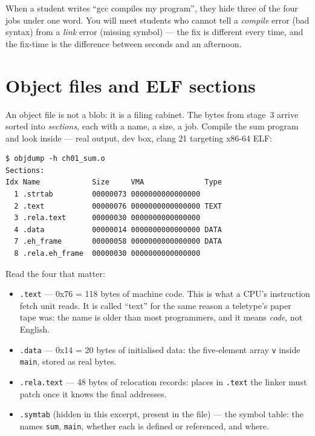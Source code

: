 \begin{tripwire}
When a student writes ``gcc compiles my program'', they hide three of the
four jobs under one word. You will meet students who cannot tell a
\emph{compile} error (bad syntax) from a \emph{link} error (missing
symbol) --- the fix is different every time, and the fix-time is the
difference between seconds and an afternoon.
\end{tripwire}

\section{Object files and ELF sections}
\label{sec:elf01}

An object file is not a blob: it is a filing cabinet. The bytes from
stage~3 arrive sorted into \emph{sections}, each with a name, a size, a
job. Compile the sum program and look inside --- real output, dev box,
clang 21 targeting x86-64 ELF:

\begin{lstlisting}[basicstyle=\ttfamily\scriptsize]
$ objdump -h ch01_sum.o
Sections:
Idx Name            Size     VMA              Type
  1 .strtab         00000073 0000000000000000
  2 .text           00000076 0000000000000000 TEXT
  3 .rela.text      00000030 0000000000000000
  4 .data           00000014 0000000000000000 DATA
  7 .eh_frame       00000058 0000000000000000 DATA
  8 .rela.eh_frame  00000030 0000000000000000
\end{lstlisting}

Read the four that matter:

\begin{itemize}
  \item \texttt{.text} --- 0x76 = 118 bytes of machine code. This is what
        a CPU's instruction fetch unit reads. It is called ``text'' for
        the same reason a teletype's paper tape was: the name is older
        than most programmers, and it means \emph{code}, not English.
  \item \texttt{.data} --- 0x14 = 20 bytes of initialised data: the
        five-element array \texttt{v} inside \texttt{main}, stored as
        real bytes.
  \item \texttt{.rela.text} --- 48 bytes of relocation records: places in
        \texttt{.text} the linker must patch once it knows the final
        addresses.
  \item \texttt{.symtab} (hidden in this excerpt, present in the file)
        --- the symbol table: the names \texttt{sum}, \texttt{main},
        whether each is defined or referenced, and where.
\end{itemize}

